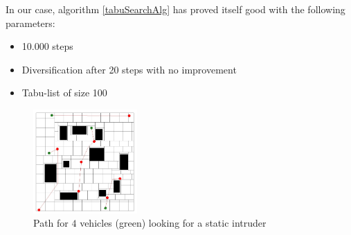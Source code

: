 In our case, algorithm \ref{tabuSearchAlg} has proved itself good with the following parameters:
\begin{itemize}[topsep=0pt,itemsep=0ex,partopsep=1ex,parsep=1ex]
 \item 10.000 steps
 \item Diversification after 20 steps with no improvement
 \item Tabu-list of size 100
\end{itemize}




\begin{figure}[h!t]
	\begin{center}
	\includegraphics[width=150px]{fig/dynamicPath.jpg}
	\end{center}
	\caption{Path for $4$ vehicles (green) looking for a static intruder}
	\label{dynamicPath}
\end{figure}


